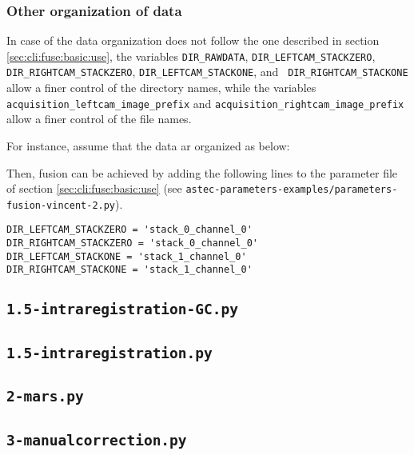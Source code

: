 \subsubsection{Other organization of data}

In case of the data organization does not follow the one described in section \ref{sec:cli:fuse:basic:use}, the variables
\verb|DIR_RAWDATA|, \verb|DIR_LEFTCAM_STACKZERO|,  \verb|DIR_RIGHTCAM_STACKZERO|, \verb|DIR_LEFTCAM_STACKONE|, and \verb| DIR_RIGHTCAM_STACKONE| allow a finer control of the directory names, while the variables
\verb|acquisition_leftcam_image_prefix| and 
\verb|acquisition_rightcam_image_prefix| allow a finer control of the file names.

For instance, assume that the data ar organized as below:

Then, fusion can be achieved by adding the following lines to the parameter file of section \ref{sec:cli:fuse:basic:use}  (see \texttt{astec-parameters-examples/parameters-fusion-vincent-2.py}).

\begin{verbatim}
DIR_LEFTCAM_STACKZERO = 'stack_0_channel_0'
DIR_RIGHTCAM_STACKZERO = 'stack_0_channel_0'
DIR_LEFTCAM_STACKONE = 'stack_1_channel_0'
DIR_RIGHTCAM_STACKONE = 'stack_1_channel_0'
\end{verbatim}

\subsection{\texttt{1.5-intraregistration-GC.py}}

\subsection{\texttt{1.5-intraregistration.py}}

\subsection{\texttt{2-mars.py}}

\subsection{\texttt{3-manualcorrection.py}}

